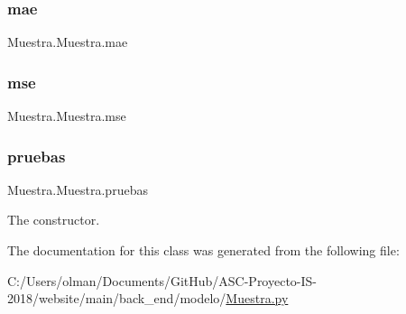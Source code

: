 \subsubsection{\texorpdfstring{mae}{mae}}
{\footnotesize\ttfamily Muestra.\+Muestra.\+mae}

\mbox{\label{class_muestra_1_1_muestra_aef455f777517629e914cab0adfc2bf90}} 
\subsubsection{\texorpdfstring{mse}{mse}}
{\footnotesize\ttfamily Muestra.\+Muestra.\+mse}

\mbox{\label{class_muestra_1_1_muestra_a8332ed8ec72e86e0edbfa22bed6f3828}} 
\subsubsection{\texorpdfstring{pruebas}{pruebas}}
{\footnotesize\ttfamily Muestra.\+Muestra.\+pruebas}



The constructor. 



The documentation for this class was generated from the following file\+:\begin{DoxyCompactItemize}
\item 
C\+:/\+Users/olman/\+Documents/\+Git\+Hub/\+A\+S\+C-\/\+Proyecto-\/\+I\+S-\/2018/website/main/back\+\_\+end/modelo/\mbox{\hyperlink{_muestra_8py}{Muestra.\+py}}\end{DoxyCompactItemize}
